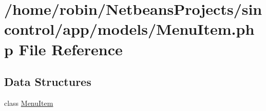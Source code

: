 \hypertarget{_menu_item_8php}{}\section{/home/robin/\+Netbeans\+Projects/sincontrol/app/models/\+Menu\+Item.php File Reference}
\label{_menu_item_8php}
\subsection*{Data Structures}
\begin{DoxyCompactItemize}
\item 
class \hyperlink{class_menu_item}{Menu\+Item}
\end{DoxyCompactItemize}
